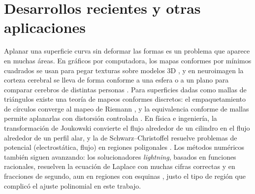 \section{Desarrollos recientes y otras aplicaciones}

Aplanar una superficie curva sin deformar las formas es un problema que
aparece en muchas áreas. En gráficos por computadora, los mapas conformes por
mínimos cuadrados se usan para pegar texturas sobre modelos 3D
\cite{levy2002}, y en neuroimagen la corteza cerebral se lleva de forma
conforme a una esfera o a un plano para comparar cerebros de distintas
personas \cite{gu2004,hurdal2004}. Para superficies dadas como mallas de triángulos
existe una teoría de mapeos conformes discretos: el empaquetamiento de
círculos converge al mapeo de Riemann \cite{rodin1987}, y la equivalencia
conforme de mallas permite aplanarlas con distorsión controlada
\cite{springborn2008}. En física e ingeniería, la transformación de Joukowski
convierte el flujo alrededor de un cilindro en el flujo alrededor de un perfil
alar, y la de Schwarz--Christoffel resuelve problemas de potencial
(electrostática, flujo) en regiones poligonales \cite{driscoll2002}. Los
métodos numéricos también siguen avanzando: los solucionadores
\emph{lightning}, basados en funciones racionales, resuelven la ecuación de
Laplace con muchas cifras correctas y en fracciones de segundo, aun en
regiones con esquinas \cite{gopal2019},
justo el tipo de región que complicó el ajuste polinomial en este trabajo.
